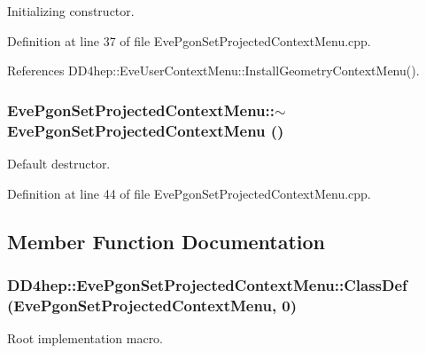 Initializing constructor. 

Definition at line 37 of file EvePgonSetProjectedContextMenu.cpp.

References DD4hep::EveUserContextMenu::InstallGeometryContextMenu().\hypertarget{class_d_d4hep_1_1_eve_pgon_set_projected_context_menu_a2872930488e4ef2ef159f765acaea703}{
\subsubsection[{$\sim$EvePgonSetProjectedContextMenu}]{\setlength{\rightskip}{0pt plus 5cm}EvePgonSetProjectedContextMenu::$\sim$EvePgonSetProjectedContextMenu ()}}
\label{class_d_d4hep_1_1_eve_pgon_set_projected_context_menu_a2872930488e4ef2ef159f765acaea703}


Default destructor. 

Definition at line 44 of file EvePgonSetProjectedContextMenu.cpp.

\subsection{Member Function Documentation}
\hypertarget{class_d_d4hep_1_1_eve_pgon_set_projected_context_menu_aea367eff04cd968f43590dd69a718ffb}{
\subsubsection[{ClassDef}]{\setlength{\rightskip}{0pt plus 5cm}DD4hep::EvePgonSetProjectedContextMenu::ClassDef ({\bf EvePgonSetProjectedContextMenu}, \/  0)}}
\label{class_d_d4hep_1_1_eve_pgon_set_projected_context_menu_aea367eff04cd968f43590dd69a718ffb}


Root implementation macro. 

